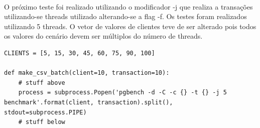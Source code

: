 \documentclass[12pt, a4paper, twoside, titlepage]{article}
\begin{document}
\\O próximo teste foi realizado utilizando o modificador -j que realiza a transações utilizando-se threads utilizado alterando-se a flag -f. Os testes foram realizados utilizando 5 threads. O vetor de valores de clientes teve de ser alterado pois todos os valores do cenário devem ser múltiplos do número de threads.
\begin{lstlisting}
CLIENTS = [5, 15, 30, 45, 60, 75, 90, 100]

def make_csv_batch(client=10, transaction=10):
	# stuff above
    process = subprocess.Popen('pgbench -d -C -c {} -t {} -j 5 benchmark'.format(client, transaction).split(), stdout=subprocess.PIPE)
	# stuff below
\end{lstlisting}

%
%

\end{document}

